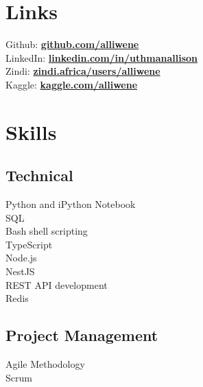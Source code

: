 \documentclass[letterpaper]{deedy-resume} %
\begin{document}
\begin{minipage}[t]{0.33\textwidth} %



\section{Links} 
Github: \href{https://github.com/alliwene}{\bf github.com/alliwene} \\
LinkedIn: \href{https://www.linkedin.com/in/uthmanallison}{\bf linkedin.com/in/uthmanallison} \\
Zindi: \href{https://zindi.africa/users/alliwene}{\bf zindi.africa/users/alliwene} \\
Kaggle: \href{https://kaggle.com/alliwene}{\bf kaggle.com/alliwene} \\

\sectionspace %




\section{Skills}

\subsection{Technical}
Python and iPython Notebook \\
SQL \\
Bash shell scripting \\
TypeScript \\
Node.js \\
NestJS \\
REST API development \\
Redis

\sectionspace %

\subsection{Project Management}
Agile Methodology \\
Scrum \\


\end{minipage}
\end{document}
